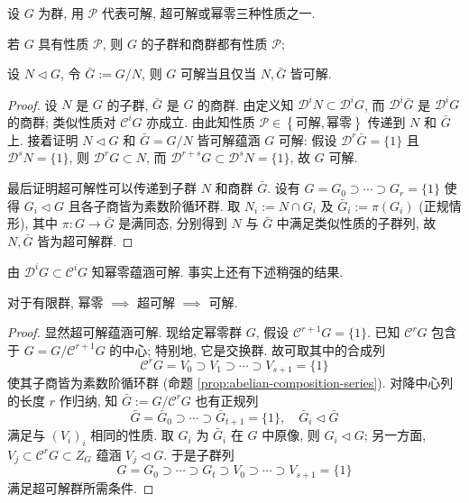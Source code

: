 \begin{lemma}\label{prop:solvable-ses}
	设 $G$ 为群, 用 $\mathcal{P}$ 代表可解, 超可解或幂零三种性质之一.
	\begin{compactitem}
		\item 若 $G$ 具有性质 $\mathcal{P}$, 则 $G$ 的子群和商群都有性质 $\mathcal{P}$;
		\item 设 $N \lhd G$, 令 $\bar{G} := G/N$, 则 $G$ 可解当且仅当 $N, \bar{G}$ 皆可解.
	\end{compactitem}
\end{lemma}
\begin{proof}
	设 $N$ 是 $G$ 的子群, $\bar{G}$ 是 $G$ 的商群. 由定义知 $\mathscr{D}^i N \subset \mathscr{D}^i G$, 而 $\mathscr{D}^i \bar{G}$ 是 $\mathscr{D}^i G$ 的商群; 类似性质对 $\mathscr{C}^i G$ 亦成立. 由此知性质 $\mathcal{P} \in \left\{\text{可解}, \text{幂零}\right\}$ 传递到 $N$ 和 $\bar{G}$ 上. 接着证明 $N \lhd G$ 和 $\bar{G} = G/N$ 皆可解蕴涵 $G$ 可解: 假设 $\mathscr{D}^r \bar{G} = \{1\}$ 且 $\mathscr{D}^s N = \{1\}$, 则 $\mathscr{D}^r G \subset N$, 而 $\mathscr{D}^{r+s} G \subset \mathscr{D}^s N = \{1\}$, 故 $G$ 可解.

	最后证明超可解性可以传递到子群 $N$ 和商群 $\bar{G}$. 设有 $G = G_0 \supset \cdots \supset G_r = \{1\}$ 使得 $G_i \lhd G$ 且各子商皆为素数阶循环群. 取 $N_i := N \cap G_i$ 及 $\bar{G}_i := \pi(G_i)$ (正规情形), 其中 $\pi: G \to \bar{G}$ 是满同态, 分别得到 $N$ 与 $\bar{G}$ 中满足类似性质的子群列, 故 $N, \bar{G}$ 皆为超可解群.
\end{proof}

由 $\mathscr{D}^i G \subset \mathscr{C}^i G$ 知幂零蕴涵可解. 事实上还有下述稍强的结果.
\begin{lemma}
	对于有限群, 幂零 $\implies$ 超可解 $\implies$ 可解.
\end{lemma}
\begin{proof}
	显然超可解蕴涵可解. 现给定幂零群 $G$, 假设 $\mathscr{C}^{r+1}G = \{1\}$. 已知 $\mathscr{C}^r G$ 包含于 $G = G/\mathscr{C}^{r+1} G$ 的中心; 特别地, 它是交换群. 故可取其中的合成列
	\[ \mathscr{C}^r G = V_0 \supset V_1 \supset \cdots \supset V_{s+1} = \{1\} \]
	使其子商皆为素数阶循环群 (命题 \ref{prop:abelian-composition-series}). 对降中心列的长度 $r$ 作归纳, 知 $\bar{G} := G/\mathscr{C}^r G$ 也有正规列
	\[ \bar{G} = \bar{G}_0  \supset \cdots \supset \bar{G}_{t+1} = \{1\}, \quad \bar{G}_i \lhd \bar{G} \]
	满足与 $(V_i)_i$ 相同的性质. 取 $G_i$ 为 $\bar{G}_i$ 在 $G$ 中原像, 则 $G_i \lhd G$; 另一方面, $V_j \subset \mathscr{C}^r G \subset Z_G$ 蕴涵 $V_j \lhd G$. 于是子群列
	\[ G = G_0 \supset \cdots \supset G_t \supset V_0 \supset \cdots \supset V_{s+1} = \{1\} \]
	满足超可解群所需条件.
\end{proof}

